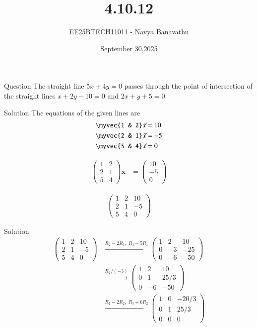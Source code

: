 \documentclass{beamer}
\title{4.10.12}
\date{September 30,2025}
\author{EE25BTECH11011 - Navya Banavathu}
\begin{document}
\frame{\titlepage}

\begin{frame}{Question}
 The straight line $5x+4y=0$ passes through the point of intersection of the straight lines $x+2y-10 = 0$ and $2x+y+5 = 0$.
\end{frame}

\begin{frame}{Solution}
The equations of the given lines are
\begin{align}
    \myvec{1 & 2}\vec{x} &= 10 \\
    \myvec{2 & 1}\vec{x} &= -5 \\
    \myvec{5 & 4}\vec{x} &= 0 
\end{align}

\begin{align}
\begin{pmatrix}
1 & 2\\
2 & 1\\
5 & 4
\end{pmatrix}
\mathbf{x} &=
\begin{pmatrix}
10\\
-5\\
0
\end{pmatrix}
\end{align}

\begin{align}
\left(\begin{array}{cc|c}
1 & 2 & 10\\
2 & 1 & -5\\
5 & 4 & 0
\end{array}\right)
\end{align}
\end{frame}

\begin{frame}{Solution}
\begin{align}
\left(\begin{array}{cc|c}
1 & 2 & 10\\
2 & 1 & -5\\
5 & 4 & 0
\end{array}\right)
&\xrightarrow{R_2-2R_1,\;R_3-5R_1}
\left(\begin{array}{cc|c}
1 & 2 & 10\\
0 & -3 & -25\\
0 & -6 & -50
\end{array}\right) \\[6pt]
&\xrightarrow{R_2/(-3)}
\left(\begin{array}{cc|c}
1 & 2 & 10\\
0 & 1 & 25/3\\
0 & -6 & -50
\end{array}\right) \\[6pt]
&\xrightarrow{R_1-2R_2,\;R_3+6R_2}
\left(\begin{array}{cc|c}
1 & 0 & -20/3\\
0 & 1 & 25/3\\
0 & 0 & 0
\end{array}\right)
\end{align}
\end{frame}
\end{document}
